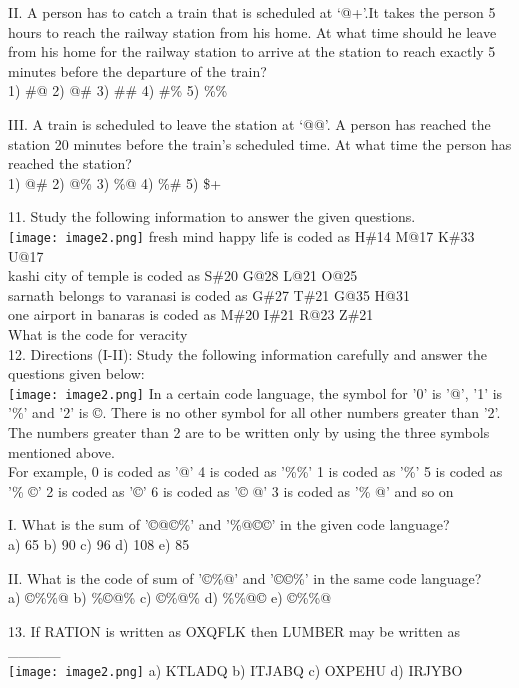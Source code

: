 \documentclass[
]{article}
\begin{document}
II. A person has to catch a train that is scheduled at ‘@+’.It takes the person 5 hours to reach
the railway station from his home. At what time should he leave from his home for the
railway station to arrive at the station to reach exactly 5 minutes before the departure of
the train?\\
1) \#@ 2) @\# 3) \#\# 4) \#\% 5) \%\%

III. A train is scheduled to leave the station at ‘@@’. A person has reached the station 20
minutes before the train’s scheduled time. At what time the person has reached the station?\\
1) @\# 2) @\% 3) \%@ 4) \%\# 5) \$+

11. Study the following information to answer the given questions.\\
\texttt{[image: image2.png]}
fresh mind happy life is coded as H\#14 M@17 K\#33 U@17\\
kashi city of temple is coded as S\#20 G@28 L@21 O@25\\
sarnath belongs to varanasi is coded as G\#27 T\#21 G@35 H@31\\
one airport in banaras is coded as M\#20 I\#21 R@23 Z\#21\\
What is the code for veracity\\

12. Directions (I-II): Study the following information carefully and answer the questions given
below:\\
\texttt{[image: image2.png]}
In a certain code language, the symbol for '0' is '@', '1' is '\%' and '2' is ©. There is no other
symbol for all other numbers greater than '2'. The numbers greater than 2 are to be written
only by using the three symbols mentioned above.\\
For example,
0 is coded as '@' 4 is coded as '\%\%'
1 is coded as '\%' 5 is coded as '\% ©'
2 is coded as '©' 6 is coded as '© @'
3 is coded as '\% @' and so on

I. What is the sum of '©@©\%' and '\%@©©' in the given code language?\\
a) 65 b) 90 c) 96 d) 108 e) 85

II. What is the code of sum of '©\%@' and '©©\%' in the same code language?\\
a) ©\%\%@ b) \%©@\% c) ©\%@\% d) \%\%@© e) ©\%\%@

13. If RATION is written as OXQFLK then LUMBER may be written as \_\_\_\_\_ \\
\texttt{[image: image2.png]}
a) KTLADQ b) ITJABQ c) OXPEHU d) IRJYBO
\end{document}
